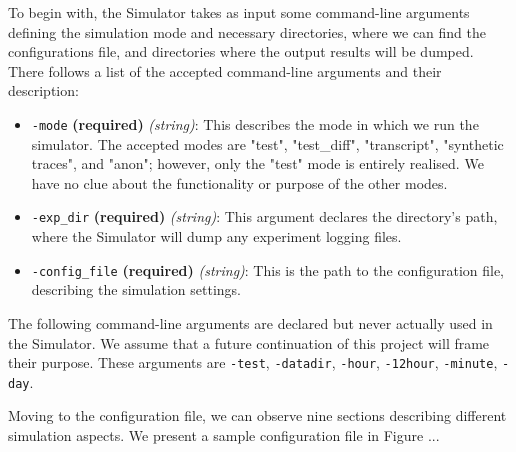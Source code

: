 \documentclass[logo,msc,cyber]{infthesis}   %
\begin{document}
To begin with, the Simulator takes as input some command-line arguments defining
the simulation mode and necessary directories, where we can find the
configurations file, and directories where the output results will be dumped.
There follows a list of the accepted command-line arguments and their
description:

\begin{itemize}
    \item[] \texttt{-mode} \textbf{(required)} \textit{(string)}: This describes the
    mode in which we run the simulator. The accepted modes are "test",
    "test\_diff", "transcript", "synthetic traces", and "anon"; however, only the
    "test" mode is entirely realised. We have no clue about the functionality or
    purpose of the other modes.
    \item[] \texttt{-exp\_dir} \textbf{(required)} \textit{(string)}: This argument
    declares the directory's path, where the Simulator will dump any experiment
    logging files.
    \item[] \texttt{-config\_file} \textbf{(required)} \textit{(string)}: This is
    the path to the configuration file, describing the simulation settings.
 \end{itemize}

The following command-line arguments are declared but never actually used in the
Simulator. We assume that a future continuation of this project will frame their
purpose. These arguments are \texttt{-test}, \texttt{-datadir}, \texttt{-hour},
\texttt{-12hour}, \texttt{-minute}, \texttt{-day}.

Moving to the configuration file, we can observe nine sections describing
different simulation aspects. We present a sample configuration file in Figure
...
\end{document}
